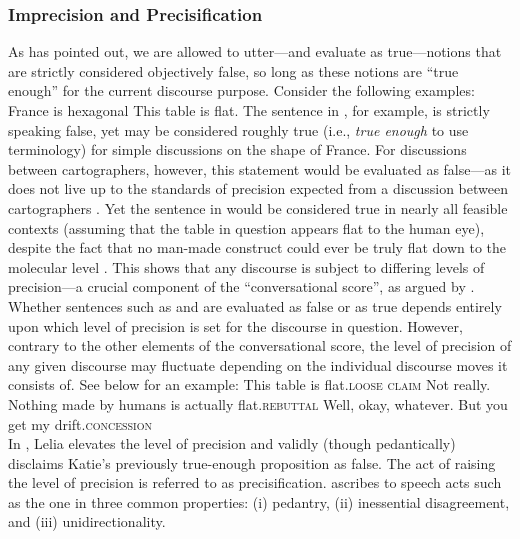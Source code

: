 \subsubsection{Imprecision and Precisification}
As \textcite[p. 352ff]{Lewis1979} has pointed out, we are allowed to utter---and evaluate as true---notions that are strictly considered objectively false, so long as these notions are \enquote{true enough} for the current discourse purpose. Consider the following examples:
\pex\a France is hexagonal\hfill\parencite[p. 142]{Austin1976}
\a This table is flat.\xe
The sentence in , for example, is strictly speaking false, yet may be considered roughly true (i.e., \textit{true enough} to use  terminology) for simple discussions on the shape of France. For discussions between cartographers, however, this statement would be evaluated as false---as it does not live up to the standards of precision expected from a discussion between cartographers \parencite[p. 142]{Austin1976}. Yet the sentence in  would be considered true in nearly all feasible contexts (assuming that the table in question appears flat to the human eye), despite the fact that no man-made construct could ever be truly flat down to the molecular level \parencite[for details, see][]{Unger1975}. This shows that any discourse is subject to differing levels of precision---a crucial component of the \enquote{conversational score}, as argued by \textcite{Lewis1979}. Whether sentences such as  and  are evaluated as false or as true depends entirely upon which level of precision is set for the discourse in question. However, contrary to the other elements of the conversational score, the level of precision of any given discourse may fluctuate depending on the individual discourse moves it consists of. See below for an example:
\pex{}
\a{}This table is flat.\hfill{\scshape loose claim}
\a{}Not really. Nothing made by humans is actually flat.\hfill{\scshape rebuttal}
\a{}Well, okay, whatever. But you get my drift.\hfill{\scshape concession}\\
\emptyfill\parencite[p. 113]{Klecha2014}
\xe
In , Lelia elevates the level of precision and validly (though pedantically) disclaims Katie's previously true-enough proposition as false. The act of raising the level of precision is referred to as precisification. \textcite[p. 114]{Klecha2014} ascribes to speech acts such as the one in  three common properties: (i) pedantry, (ii) inessential disagreement, and (iii) unidirectionality.

